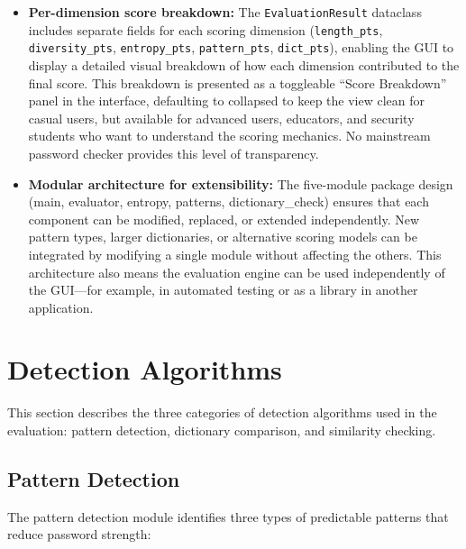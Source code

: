 \begin{itemize}
    \item \textbf{Per-dimension score breakdown:} The \texttt{EvaluationResult} dataclass includes separate fields for each scoring dimension (\texttt{length\_pts}, \texttt{diversity\_pts}, \texttt{entropy\_pts}, \texttt{pattern\_pts}, \texttt{dict\_pts}), enabling the GUI to display a detailed visual breakdown of how each dimension contributed to the final score. This breakdown is presented as a toggleable ``Score Breakdown'' panel in the interface, defaulting to collapsed to keep the view clean for casual users, but available for advanced users, educators, and security students who want to understand the scoring mechanics. No mainstream password checker provides this level of transparency.

    \item \textbf{Modular architecture for extensibility:} The five-module package design (main, evaluator, entropy, patterns, dictionary\_check) ensures that each component can be modified, replaced, or extended independently. New pattern types, larger dictionaries, or alternative scoring models can be integrated by modifying a single module without affecting the others. This architecture also means the evaluation engine can be used independently of the GUI---for example, in automated testing or as a library in another application.
\end{itemize}

\clearpage

\section{Detection Algorithms}

This section describes the three categories of detection algorithms used in the evaluation: pattern detection, dictionary comparison, and similarity checking.

\subsection{Pattern Detection}

The pattern detection module identifies three types of predictable patterns that reduce password strength:

